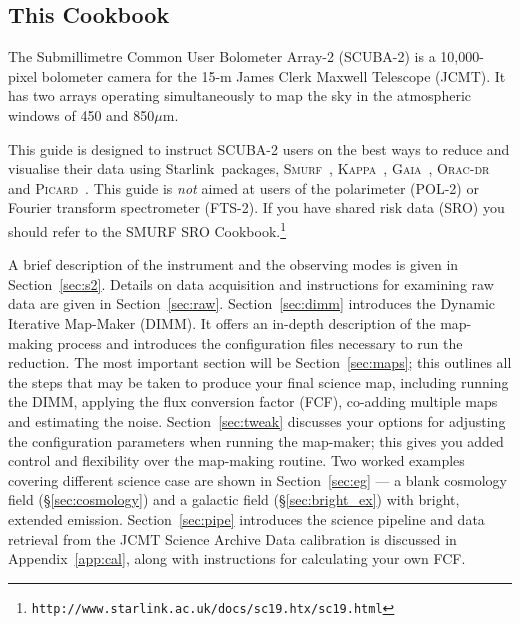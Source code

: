 \documentclass[twoside,11pt]{article}
\newcommand{\htmladdnormallink}[2]{#1}
\newcommand{\htmlref}[2]{#1}
\newenvironment{latexonly}{}{}
\newcommand{\latex}[1]{#1}
\newcommand{\latexhtml}[2]{#1}
\newcommand{\xref}[3]{#1}
\newcommand{\xlabel}[1]{}
\renewcommand{\_}{\texttt{\symbol{95}}}
\newcommand{\starlink}{\htmladdnormallink{Starlink}{http://starlink.jach.hawaii.edu}}
\newcommand{\gaia}{\xref{\textsc{Gaia}}{sun214}{}}
\newcommand{\Kappa}{\xref{\textsc{Kappa}}{sun95}{}}
\newcommand{\oracdr}{\htmladdnormallink{\textsc{Orac-dr}}{http://www.oracdr.org/oracdr}}
\newcommand{\picard}{\xref{\textsc{Picard}}{sun265}{}}
\newcommand{\smurf}{\xref{\textsc{Smurf}}{sun258}{}}
\newcommand{\cref}[3]{\latexhtml{#1~\ref{#2}}{\htmlref{#3}{#2}}}
\begin{document}
\subsection{\xlabel{using_guide}This Cookbook}

The Submillimetre Common User Bolometer Array-2 (SCUBA-2) is a
10,000-pixel bolometer camera for the 15-m James Clerk Maxwell
Telescope (JCMT). It has two arrays operating simultaneously to map
the sky in the atmospheric windows of 450 and 850$\mu$m.

This guide is designed to instruct SCUBA-2 users on the best ways to
reduce and visualise their data using \starlink\ packages,
\smurf\ \cite{smurf}, \Kappa\ \cite{kappa}, \gaia\ \cite{gaia}, \oracdr\ \cite{oracdr} and \picard\
\cite{picard}. This guide is {\em not} aimed at users of the
polarimeter (POL-2) or Fourier transform spectrometer (FTS-2). If you
have shared risk data (SRO) you should refer to the
\xref{SMURF SRO
Cookbook.}{sc19}{}\latex{\footnote{\texttt{http://www.starlink.ac.uk/docs/sc19.htx/sc19.html}}}

A brief description of the instrument and the observing modes is given
in \cref{Section}{sec:s2}{an Overview}. Details on data acquisition and
instructions for examining raw data are given in
\cref{Section}{sec:raw}{Raw SCUBA-2 data}.
\cref{Section}{sec:dimm}{This page} introduces the Dynamic Iterative Map-Maker
(DIMM). It offers an in-depth description of the map-making
process and introduces the configuration files necessary to run the
reduction. The most important section will be
\cref{Section}{sec:maps}{Reducing your data};
this outlines all the steps that may be taken to produce your final
science map, including running the DIMM, applying the flux conversion
factor (FCF), co-adding multiple maps and estimating the noise.
\cref{Section}{sec:tweak}{Tweaking the configuration file}
discusses your options for adjusting the configuration
parameters when running the map-maker; this gives you added control
and flexibility over the map-making routine. Two worked examples
covering different science case are shown in
\cref{Section}{sec:eg}{Examples} --- a
\htmlref{blank cosmology field}{sec:cosmology}
\begin{latexonly}
(\S\ref{sec:cosmology})
\end{latexonly}
and a \htmlref{galactic field}{sec:bright_ex}
\begin{latexonly}
(\S\ref{sec:bright_ex})
\end{latexonly}
with bright, extended emission.
\cref{Section}{sec:pipe}{SCUBA-2 Pipeline} introduces the science
pipeline and data retrieval from the
\htmladdnormallink{JCMT Science Archive}{http://www3.cadc-ccda.hia-iha.nrc-cnrc.gc.ca/jcmt/}
Data calibration is discussed in \cref{Appendix}{app:cal}{SCUBA-2 data
calibration}, along with instructions for calculating your own FCF.
\end{document}
